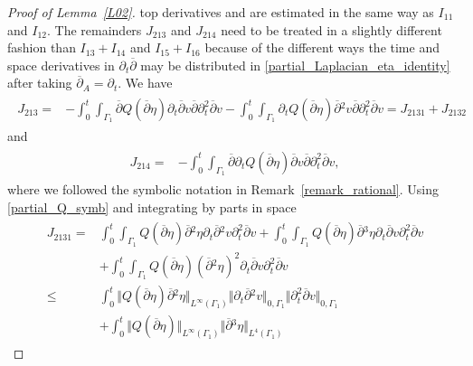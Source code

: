 \documentclass[10pt,reqno]{amsart}
\theoremstyle{plain}
\theoremstyle{definition}
\numberwithin{equation}{section}
\newcommand{\Ga}{\Gamma}
\newcommand{\norm}[1]{\Vert#1\Vert}
\begin{document}
\begin{proof}[Proof of Lemma~\ref{L02}]
top derivatives and are estimated in the same way as $I_{11}$ and $I_{12}$.
The remainders $J_{213}$ and $J_{214}$ need to be treated in a slightly different
fashion than $I_{13}+I_{14}$ and $I_{15}+I_{16}$ because of the different ways the 
time and space derivatives in $\partial_t\overline{\partial}$ may be distributed 
in \eqref{partial_Laplacian_eta_identity} after taking $\overline{\partial}_A = \partial_t$.
We have
\begin{align}
\begin{split}
J_{213} = &
 -\int_0^t \int_{\Ga_1} \overline{\partial} Q(\overline{\partial} \eta)
\partial_t \overline{\partial} v \overline{\partial} \partial^2_t \overline{\partial} v
 -\int_0^t \int_{\Ga_1} \partial_t Q(\overline{\partial} \eta)
\overline{\partial}{}^2 v \overline{\partial} \partial^2_t \overline{\partial} v
=
J_{2131} + J_{2132}
\end{split}
\nonumber
\end{align}
and
\begin{align}
\begin{split}
J_{214} 
= & -\int_0^t \int_{\Ga_1} \overline{\partial} \partial_t Q(\overline{\partial} \eta)
\overline{\partial} v \overline{\partial} \partial^2_t \overline{\partial} v,
\end{split}
\nonumber
\end{align}
where we followed the symbolic notation in Remark~\ref{remark_rational}.
Using \eqref{partial_Q_symb} and integrating by parts in space
\begin{align}
\begin{split}
J_{2131} = & 
 \int_0^t \int_{\Ga_1} Q(\overline{\partial} \eta)
  \overline{\partial}{}^2 \eta 
\partial_t \overline{\partial}{}^2 v \partial^2_t \overline{\partial} v
 +\int_0^t \int_{\Ga_1} Q(\overline{\partial} \eta)
  \overline{\partial}{}^3 \eta 
\partial_t \overline{\partial} v \partial^2_t \overline{\partial} v
\\
&
 +\int_0^t \int_{\Ga_1} Q(\overline{\partial} \eta)
  (\overline{\partial}{}^2 \eta)^2 
\partial_t \overline{\partial} v \partial^2_t \overline{\partial} v
\\
\leq  &
\int_0^t \norm{ Q(\overline{\partial} \eta) \overline{\partial}{}^2 \eta}_{L^\infty(\Ga_1)}
\norm{\partial_t \overline{\partial}{}^2 v}_{0,\Ga_1} \norm{\partial^2_t \overline{\partial} v }_{0,\Ga_1}
\\
&
+ \int_0^t \norm{ Q(\overline{\partial} \eta) }_{L^\infty(\Ga_1)}
\norm{\overline{\partial}{}^3 \eta}_{L^4(\Ga_1)} 

\end{split}
\end{align}
\end{proof}
\end{document}
